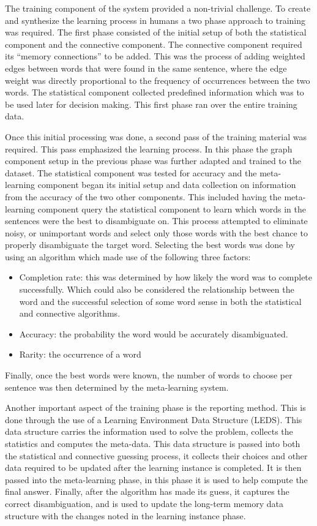The training component of the system provided a non-trivial challenge.  To
create and synthesize the learning process in humans a two phase approach to
training was required.  The first phase consisted of the initial setup of both
the statistical component and the connective component. The connective component
required its ``memory connections'' to be added.  This was the process of adding
weighted edges between words that were found in the same sentence, where the
edge weight was directly proportional to the frequency of occurrences between
the two words.  The statistical component collected predefined information which
was to be used later for decision making.  This first phase ran over the entire
training data.

Once this initial processing was done, a second pass of the training material
was required.  This pass emphasized the learning process.  In this phase the
graph component setup in the previous phase was further adapted and trained to
the dataset.  The statistical component was tested for accuracy and the meta-
learning component began its initial setup and data collection on information
from the accuracy of the two other components. This included having the meta-
learning component query the statistical component to learn which words in the
sentences were the best to disambiguate on. This process attempted to eliminate
noisy, or unimportant words and select only those words with the best chance to
properly disambiguate the target word.  Selecting the best words was done by
using an algorithm which made use of the following three factors:

\begin{itemize}
	\item Completion rate: this was determined by how likely the
word was to complete successfully. Which could also be considered the
relationship between the word and the successful selection of some word sense in
both the statistical and connective algorithms.      
	\item Accuracy: the probability the word would be accurately disambiguated.     
	\item Rarity: the occurrence of a word 
\end{itemize}

Finally, once the best words were known, the number of words to choose per
sentence was then determined by the meta-learning system.

Another important aspect of the training phase is the reporting method.  This is
done through the use of a Learning Environment Data Structure (LEDS).  This data
structure carries the information used to solve the problem, collects the
statistics and computes the meta-data. This data structure is passed into both
the statistical and connective guessing process, it collects their choices and
other data required to be updated after the learning instance is completed.  It
is then passed into the meta-learning phase, in this phase it is used to help
compute the final answer. Finally, after the algorithm has made its guess, it
captures the correct disambiguation, and is used to update the long-term memory
data structure with the changes noted in the learning instance phase.

